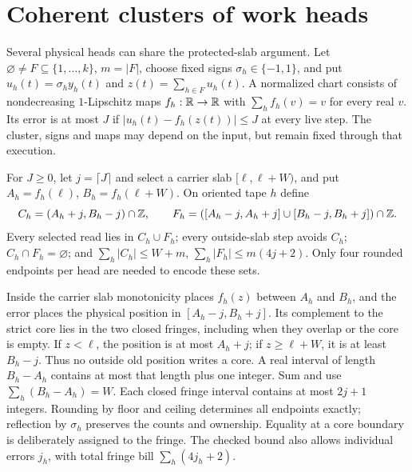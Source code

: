 \section{Coherent clusters of work heads}\label{sec:clusters}

Several physical heads can share the protected-slab argument. Let
$\varnothing\ne F\subseteq\{1,\ldots,k\}$, $m=|F|$, choose fixed signs
$\sigma_h\in\{-1,1\}$, and put $u_h(t)=\sigma_hy_h(t)$ and
$z(t)=\sum_{h\in F}u_h(t)$. A normalized chart consists of nondecreasing
$1$-Lipschitz maps $f_h:\mathbb{R}\to\mathbb{R}$ with $\sum_h f_h(v)=v$ for every real
$v$. Its error is at most $J$ if $|u_h(t)-f_h(z(t))|\le J$ at every live
step. The cluster, signs and maps may depend on the input, but remain fixed
through that execution.

\begin{lemma}\label{lem:cores}
For $J\ge0$, let $j=\lceil J\rceil$ and select a carrier slab $[\ell,\ell+W)$, and put
$A_h=f_h(\ell)$, $B_h=f_h(\ell+W)$. On oriented tape $h$ define
\[
 C_h=(A_h+j,B_h-j)\cap\mathbb{Z},\qquad
 F_h=([A_h-j,A_h+j]\cup[B_h-j,B_h+j])\cap\mathbb{Z}.
\]
Every selected read lies in $C_h\cup F_h$; every outside-slab step avoids
$C_h$; $C_h\cap F_h=\varnothing$; and
$\sum_h|C_h|\le W+m$, $\sum_h|F_h|\le m(4j+2)$.
Only four rounded endpoints per head are needed to encode these sets.
\end{lemma}
\begin{outline}
Inside the carrier slab monotonicity places $f_h(z)$ between $A_h$ and
$B_h$, and the error places the physical position in $[A_h-j,B_h+j]$.
Its complement to the strict core lies in the two closed fringes, including
when they overlap or the core is empty. If $z<\ell$, the position is at
most $A_h+j$; if $z\ge\ell+W$, it is at least $B_h-j$. Thus no outside
old position writes a core. A real interval of length $B_h-A_h$ contains
at most that length plus one integer. Sum and use
$\sum_h(B_h-A_h)=W$. Each closed fringe interval contains at most $2j+1$
integers. Rounding by floor and ceiling determines all endpoints exactly;
reflection by $\sigma_h$ preserves the counts and ownership. Equality at a
core boundary is deliberately assigned to the fringe. The checked bound also
allows individual errors $j_h$, with total fringe bill $\sum_h(4j_h+2)$.
\end{outline}

